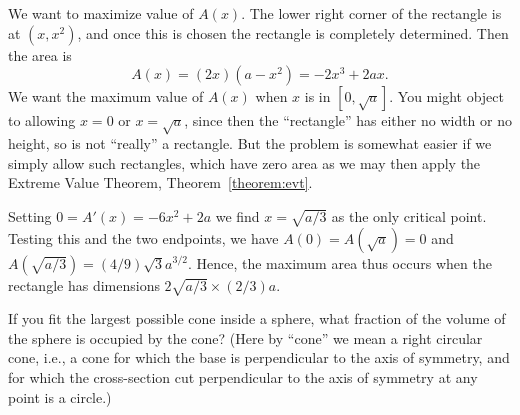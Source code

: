 \begin{solution}
We want to maximize value of $A(x)$.  The lower right corner of the
rectangle is at $(x,x^2)$, and once this is chosen the rectangle is
completely determined. Then the area is
\[
A(x)=(2x)(a-x^2)=-2x^3+2ax.
\] 
We want the maximum value of $A(x)$ when $x$ is in $[0,\sqrt{a}]$. You
might object to allowing $x=0$ or $x=\sqrt{a}$, since then the
``rectangle'' has either no width or no height, so is not ``really'' a
rectangle. But the problem is somewhat easier if we simply allow such
rectangles, which have zero area as we may then apply the Extreme
Value Theorem, Theorem~\ref{theorem:evt}.

Setting $0=A'(x)=-6x^2+2a$ we find $x=\sqrt{a/3}$ as the only critical
point. Testing this and the two endpoints, we have
$A(0)=A(\sqrt{a})=0$ and $A(\sqrt{a/3})=(4/9)\sqrt{3}a^{3/2}$. Hence,
the maximum area thus occurs when the rectangle has dimensions
$2\sqrt{a/3}\times (2/3)a$.
\end{solution}


\begin{example}
If you fit the largest possible cone inside a sphere, what fraction of the
volume of the sphere is occupied by the cone?  (Here by ``cone'' we mean a
right circular cone, i.e., a cone for which the base is perpendicular to
the axis of symmetry, and for which the cross-section cut perpendicular to
the axis of symmetry at any point is a circle.)
\end{example}

